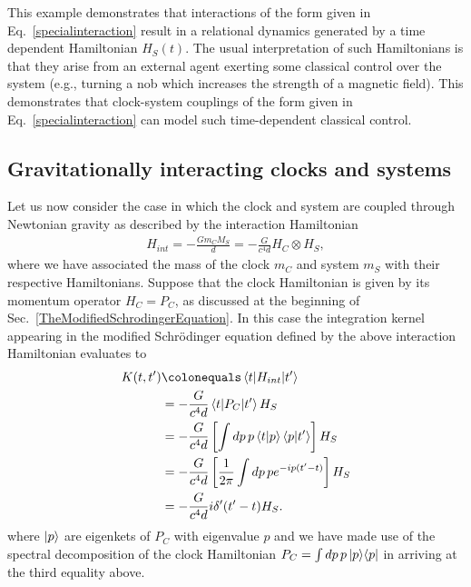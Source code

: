 \documentclass[a4paper,twocolumn,superscriptaddress,11pt,accepted=2019-06-04]{quantumarticle}
\newcommand{\ce}{\colonequals}
\newcommand{\nn}{\nonumber}		%
\begin{document}
{{This example demonstrates that interactions of the form given in Eq.~\eqref{specialinteraction} result in a relational dynamics generated by a time dependent Hamiltonian $H_S(t)$. The usual interpretation of such Hamiltonians is that they arise from an external agent exerting some classical control over the system (e.g., turning a nob which increases the strength of a magnetic field). This demonstrates that clock-system couplings of the form given in Eq.~\eqref{specialinteraction} can model such time-dependent classical control. }



\subsection{{Gravitationally interacting clocks and systems}}

{Let us now consider the case in which the clock and system are coupled through Newtonian gravity as described by the interaction Hamiltonian
\begin{align}
H_{int} = - \frac{G m_C M_S}{d} = -\frac{G}{c^4 d} H_C \otimes H_S, \nn
\end{align}
where we have associated the mass of the clock $m_C$ and system $m_S$ with their respective Hamiltonians. Suppose that the clock Hamiltonian is given by its momentum operator $H_C = P_C$, as discussed at the beginning of Sec.~\ref{TheModifiedSchrodingerEquation}. In this case the integration kernel appearing in the modified Schr\"{o}dinger equation defined by the above interaction Hamiltonian evaluates to
\begin{align}
K(t,t') &\ce \braket{t| H_{int} | t'} \nn \\
 &= -\frac{G}{c^4 d} \braket{t| P_C | t'} H_S \nn \\
&= -\frac{G}{c^4 d}  \left[ \int dp \, p  \braket{t| p} \braket{p| t'} \right] H_S \nn \\
&= -\frac{G}{c^4 d}  \left[ \frac{1}{2\pi} \int dp \, p  e^{-ip( t'-t)}      \right]H_S  \nn\\
&=  -\frac{G}{c^4 d} i \delta'(t'-t) H_S. \label{gravKernal}
\end{align}
 where $\ket{p}$ are eigenkets of $P_C$ with eigenvalue $p$ and we have made use of the spectral decomposition of the clock Hamiltonian $P_C = \int dp \, p \ket{p}\!\bra{p}$ in arriving at the third equality above. }

}
\end{document}
